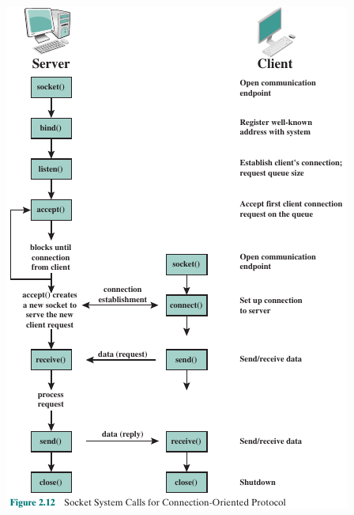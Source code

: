 \documentclass[pdflatex,compress]{beamer}
\begin{document}
\begin{frame}
	\begin{center}
		\includegraphics[height=0.8\textheight]{img/img17}
	\end{center}
\end{frame}
\end{document}
